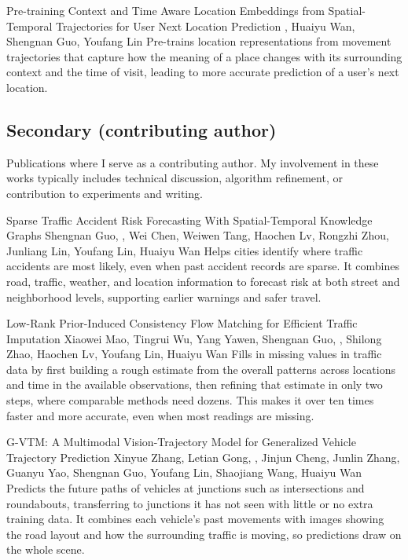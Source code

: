 {Pre-training Context and Time Aware Location Embeddings from Spatial-Temporal Trajectories for User Next Location Prediction}
{\me, Huaiyu Wan, Shengnan Guo, Youfang Lin}
{Pre-trains location representations from movement trajectories that capture how the meaning of a place changes with its surrounding context and the time of visit, leading to more accurate prediction of a user's next location.}

\subsection*{Secondary (contributing author)}
Publications where I serve as a contributing author. My involvement in these works typically includes technical discussion, algorithm refinement, or contribution to experiments and writing.

{Sparse Traffic Accident Risk Forecasting With Spatial-Temporal Knowledge Graphs}
{Shengnan Guo, \me, Wei Chen, Weiwen Tang, Haochen Lv, Rongzhi Zhou, Junliang Lin, Youfang Lin, Huaiyu Wan}
{Helps cities identify where traffic accidents are most likely, even when past accident records are sparse. It combines road, traffic, weather, and location information to forecast risk at both street and neighborhood levels, supporting earlier warnings and safer travel.}

{Low-Rank Prior-Induced Consistency Flow Matching for Efficient Traffic Imputation}
{Xiaowei Mao, Tingrui Wu, Yang Yawen, Shengnan Guo, \me, Shilong Zhao, Haochen Lv, Youfang Lin, Huaiyu Wan}
{Fills in missing values in traffic data by first building a rough estimate from the overall patterns across locations and time in the available observations, then refining that estimate in only two steps, where comparable methods need dozens. This makes it over ten times faster and more accurate, even when most readings are missing.}

{G-VTM: A Multimodal Vision-Trajectory Model for Generalized Vehicle Trajectory Prediction}
{Xinyue Zhang, Letian Gong, \me, Jinjun Cheng, Junlin Zhang, Guanyu Yao, Shengnan Guo, Youfang Lin, Shaojiang Wang, Huaiyu Wan}
{Predicts the future paths of vehicles at junctions such as intersections and roundabouts, transferring to junctions it has not seen with little or no extra training data. It combines each vehicle's past movements with images showing the road layout and how the surrounding traffic is moving, so predictions draw on the whole scene.}

